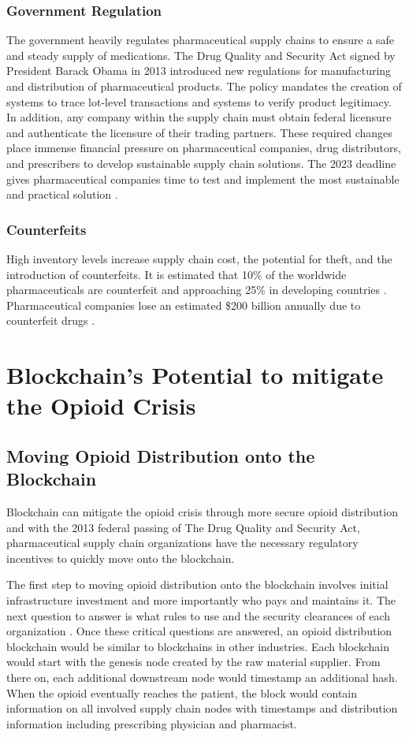 \documentclass[sigconf]{acmart}
\begin{document}
\subsubsection{Government Regulation} The government heavily regulates pharmaceutical supply chains to ensure a safe and steady supply of medications. The Drug Quality and Security Act signed by President Barack Obama in 2013 introduced new regulations for manufacturing and distribution of pharmaceutical products. The policy mandates the creation of systems to trace lot-level transactions and systems to verify product legitimacy. In addition, any company within the supply chain must obtain federal licensure and authenticate the licensure of their trading partners. These required changes place immense financial pressure on pharmaceutical companies, drug distributors, and prescribers to develop sustainable supply chain solutions. The 2023 deadline gives pharmaceutical companies time to test and implement the most sustainable and practical solution \cite{opsis8}.
\subsubsection{Counterfeits} High inventory levels increase supply chain cost, the potential for theft, and the introduction of counterfeits. It is estimated that 10\% of the worldwide pharmaceuticals are counterfeit and approaching 25\% in developing countries \cite{Kelesidis01}. Pharmaceutical companies lose an estimated \$200 billion annually due to counterfeit drugs \cite{das2017}.  

\section{Blockchain's Potential to mitigate the Opioid Crisis}
\subsection{Moving Opioid Distribution onto the Blockchain}
Blockchain can mitigate the opioid crisis through more secure opioid distribution and with the 2013 federal passing of The Drug Quality and Security Act, pharmaceutical supply chain organizations have the necessary regulatory incentives to quickly move onto the blockchain.

The first step to moving opioid distribution onto the blockchain involves initial infrastructure investment and more importantly who pays and maintains it. The next question to answer is what rules to use and the security clearances of each organization \cite{Christidis01}. Once these critical questions are answered, an opioid distribution blockchain would be similar to blockchains in other industries. Each blockchain would start with the genesis node created by the raw material supplier. From there on, each additional downstream node would timestamp an additional hash. When the opioid eventually reaches the patient, the block would contain information on all involved supply chain nodes with timestamps and distribution information including prescribing physician and pharmacist. 
\end{document}
